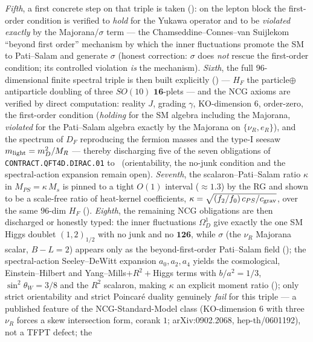\documentclass[11pt,a4paper]{article}
\begin{document}
\begin{keybox}
\emph{Fifth}, a first concrete step on that triple is taken (): on the
lepton block the first-order condition is verified to \emph{hold} for the Yukawa operator and to be
\emph{violated exactly} by the Majorana/$\sigma$ term --- the Chamseddine--Connes--van Suijlekom ``beyond
first order'' mechanism by which the inner fluctuations promote the SM to Pati--Salam and generate $\sigma$
(honest correction: $\sigma$ does \emph{not} rescue the first-order condition; its controlled violation
\emph{is} the mechanism).
\emph{Sixth}, the full $96$-dimensional finite spectral triple is then built explicitly
() --- $H_F$ the particle$\oplus$antiparticle doubling of three $SO(10)$
$\mathbf{16}$-plets --- and the NCG axioms are verified by direct computation: reality $J$, grading $\gamma$,
KO-dimension $6$, order-zero, the first-order condition (\emph{holding} for the SM algebra including the
Majorana, \emph{violated} for the Pati--Salam algebra exactly by the Majorana on $\{\nu_R,e_R\}$), and the
spectrum of $D_F$ reproducing the fermion masses and the type-I seesaw $m_{\rm light}=m_D^2/M_R$ --- thereby
discharging five of the seven obligations of \texttt{CONTRACT.QFT4D.DIRAC.01} to \mE\ (orientability, the
no-junk condition and the spectral-action expansion remain open).
\emph{Seventh}, the scalaron--Pati--Salam ratio $\kappa$ in $M_{PS}=\kappa\,M_s$ is pinned to a tight $O(1)$
interval ($\approx1.3$) by the RG and shown to be a scale-free ratio of heat-kernel coefficients,
$\kappa=\sqrt{(f_2/f_0)\,c_{PS}/c_{\rm grav}}$, over the same $96$-dim $H_F$ ().
\emph{Eighth}, the remaining NCG obligations are then discharged or honestly typed: the inner fluctuations
$\Omega^1_D$ give exactly the one SM Higgs doublet $(1,2)_{1/2}$ with no junk and no $\mathbf{126}$, while
$\sigma$ (the $\nu_R$ Majorana scalar, $B{-}L{=}2$) appears only as the beyond-first-order Pati--Salam field
(); the spectral-action Seeley--DeWitt expansion $a_0,a_2,a_4$ yields the
cosmological, Einstein--Hilbert and Yang--Mills$+R^2+$Higgs terms with $b/a^2=1/3$, $\sin^2\theta_W=3/8$ and
the $R^2$ scalaron, making $\kappa$ an explicit moment ratio ();
only strict orientability and strict Poincar\'e duality genuinely \emph{fail} for this triple --- a
published feature of the NCG-Standard-Model class (KO-dimension $6$ with three $\nu_R$ forces a skew
intersection form, corank $1$; arXiv:0902.2068, hep-th/0601192), not a TFPT defect; the

\end{keybox}
\end{document}
